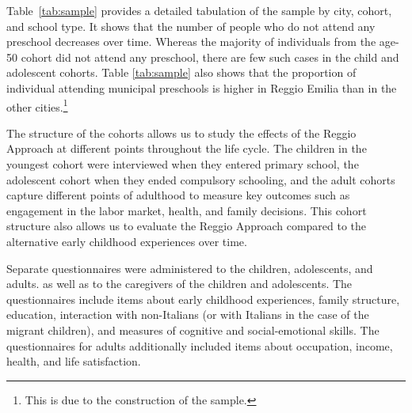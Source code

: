 Table~\ref{tab:sample} provides a detailed tabulation of the sample by city, cohort, and school type. It shows that the number of people who do not attend any preschool decreases over time. Whereas the majority of individuals from the age-50 cohort did not attend any preschool, there are few such cases in the child and adolescent cohorts. Table \ref{tab:sample} also shows that the proportion of individual attending municipal preschools is higher in Reggio Emilia than in the other cities.\footnote{This is due to the construction of the sample.} 

The structure of the cohorts allows us to study the effects of the Reggio Approach at different points throughout the life cycle. The children in the youngest cohort were interviewed when they entered primary school, the adolescent cohort when they ended compulsory schooling, and the adult cohorts capture different points of adulthood to measure key outcomes such as engagement in the labor market, health, and family decisions. This cohort structure also allows us to evaluate the Reggio Approach compared to the alternative early childhood experiences over time.

Separate questionnaires were administered to the children, adolescents, and adults. as well as to the caregivers of the children and adolescents. The questionnaires include items about early childhood experiences, family structure, education, interaction with non-Italians (or with Italians in the case of the migrant children), and measures of cognitive and social-emotional skills. The questionnaires for adults additionally included items about occupation, income, health, and life satisfaction. 


\begin{table}[H]
\centering
{}
\end{table}

